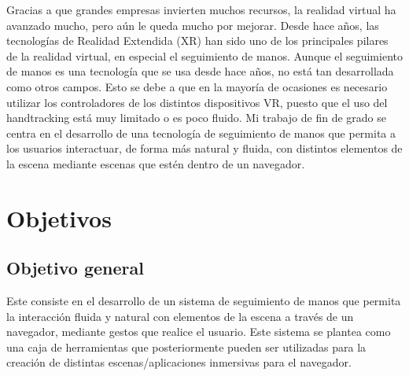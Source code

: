 \documentclass[a4paper, 12pt]{book}
\begin{document}
Gracias a que grandes empresas invierten muchos recursos, la realidad virtual ha avanzado mucho, pero aún le queda mucho por mejorar. Desde hace años, las tecnologías de Realidad Extendida (XR) han sido uno de los principales pilares de la realidad virtual, en especial el seguimiento de manos. Aunque el seguimiento de manos es una tecnología que se usa desde hace años, no está tan desarrollada como otros campos. Esto se debe a que en la mayoría de ocasiones es necesario 
utilizar los controladores de los distintos dispositivos VR, puesto que el uso del handtracking está muy limitado o es poco fluido. 
Mi trabajo de fin de grado se centra en el desarrollo de una tecnología de seguimiento de manos que permita a los usuarios interactuar, de forma más natural y fluida, con distintos elementos de la escena mediante escenas que estén dentro de un navegador. 

\section{Objetivos}
\label{sec:objetivos}

\subsection{Objetivo general}
\label{subsec:objetivo-general}
Este consiste en el desarrollo de un sistema de seguimiento de manos que permita la interacción fluida y natural con elementos de la escena a través de un navegador, mediante gestos que realice el usuario. Este sistema se plantea como una caja de herramientas que posteriormente 
pueden ser utilizadas para la creación de distintas escenas/aplicaciones inmersivas para el navegador.
\end{document}
